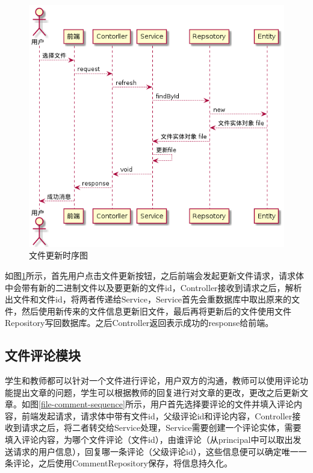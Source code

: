 \begin{figure}[H]
    \centering
    \includegraphics[scale = 0.6]{out/uml/时序图/file-refresh-sequence/file-refresh-sequence.png}
    \caption{\song\wuhao 文件更新时序图}
    \label{file-refresh-sequence}
\end{figure}

如图\ref{file-refresh-sequence}所示，首先用户点击文件更新按钮，之后前端会发起更新文件请求，请求体中会带有新的二进制文件以及要更新的文件id，Controller接收到请求之后，解析出文件和文件id，将两者传递给Service，Service首先会重数据库中取出原来的文件，然后使用新传来的文件信息更新旧文件，最后再将更新后的文件使用文件Repository写回数据库。之后Controller返回表示成功的response给前端。

\subsection{文件评论模块}

学生和教师都可以针对一个文件进行评论，用户双方的沟通，教师可以使用评论功能提出文章的问题，学生可以根据教师的回复进行对文章的更改，更改之后更新文章。如图\ref{file-comment-sequence}所示，用户首先选择要评论的文件并填入评论内容，前端发起请求，请求体中带有文件id，父级评论id和评论内容，Controller接收到请求之后，将二者转交给Service处理，Service需要创建一个评论实体，需要填入评论内容，为哪个文件评论（文件id），由谁评论（从principal中可以取出发送请求的用户信息），回复哪一条评论（父级评论id），这些信息便可以确定唯一一条评论，之后使用CommentRepository保存，将信息持久化。

